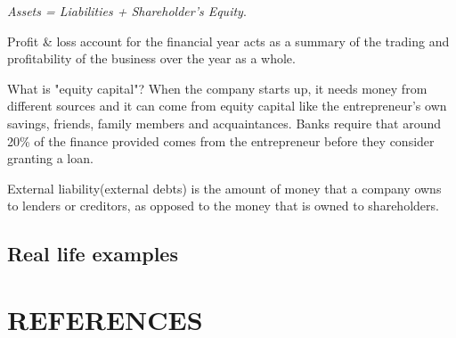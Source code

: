 \documentclass[12pt]{article}
\providecommand\phantomsection{} %
\begin{document}
\begin{center}
\textit{Assets = Liabilities + Shareholder's Equity}.
\end{center}

Profit \& loss account for the financial year acts as a summary of the trading and profitability of the business over the year as a whole.

What is "equity capital"? When the company starts up, it needs money from different sources and it can come from equity capital like the entrepreneur's own savings, friends, family members and acquaintances. Banks require that around 20\% of the finance provided comes from the entrepreneur before they consider granting a loan.

External liability(external debts) is the amount of money that a company owns to lenders or creditors, as opposed to the money that is owned to shareholders.

\subsection{Real life examples}



\clearpage

\begingroup 
\linespread{1}

\setlength\bibitemsep{\baselineskip}

\setlength{\bibhang}{0pt}

\section*{REFERENCES}
\phantomsection
{}%

\printbibliography[heading=none]
\endgroup
\end{document}
